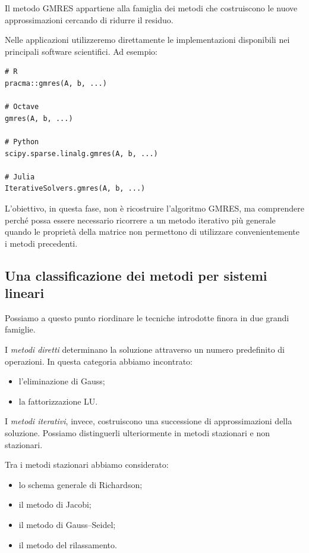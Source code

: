 Il metodo GMRES appartiene alla famiglia dei metodi che costruiscono
le nuove approssimazioni cercando di ridurre il residuo.

Nelle applicazioni utilizzeremo direttamente le implementazioni
disponibili nei principali software scientifici. Ad esempio:

\begin{verbatim}
# R
pracma::gmres(A, b, ...)

# Octave
gmres(A, b, ...)

# Python
scipy.sparse.linalg.gmres(A, b, ...)

# Julia
IterativeSolvers.gmres(A, b, ...)
\end{verbatim}

L'obiettivo, in questa fase, non è ricostruire l'algoritmo GMRES,
ma comprendere perché possa essere necessario ricorrere a un metodo
iterativo più generale quando le proprietà della matrice non
permettono di utilizzare convenientemente i metodi precedenti.


\subsection{Una classificazione dei metodi per sistemi lineari}

Possiamo a questo punto riordinare le tecniche introdotte finora
in due grandi famiglie.

I \emph{metodi diretti} determinano la soluzione attraverso un
numero predefinito di operazioni. In questa categoria abbiamo
incontrato:

\begin{itemize}
    \item l'eliminazione di Gauss;
    \item la fattorizzazione LU.
\end{itemize}

I \emph{metodi iterativi}, invece, costruiscono una successione
di approssimazioni della soluzione. Possiamo distinguerli
ulteriormente in metodi stazionari e non stazionari.

Tra i metodi stazionari abbiamo considerato:

\begin{itemize}
    \item lo schema generale di Richardson;
    \item il metodo di Jacobi;
    \item il metodo di Gauss--Seidel;
    \item il metodo del rilassamento.
\end{itemize}

